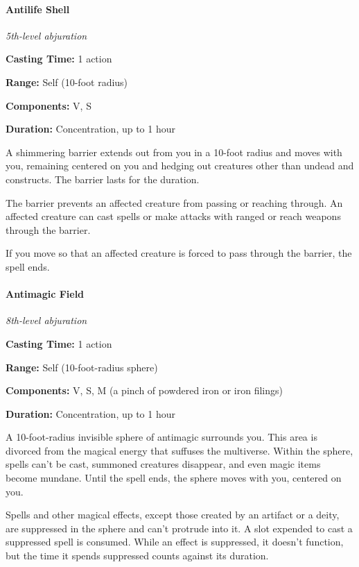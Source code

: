 \documentclass[
]{article}
\begin{document}
\hypertarget{antilife-shell}{%
\paragraph{Antilife Shell}\label{antilife-shell}}

\emph{5th-level abjuration}

\textbf{Casting Time:} 1 action

\textbf{Range:} Self (10-foot radius)

\textbf{Components:} V, S

\textbf{Duration:} Concentration, up to 1 hour

A shimmering barrier extends out from you in a 10-foot radius and moves
with you, remaining centered on you and hedging out creatures other than
undead and constructs. The barrier lasts for the duration.

The barrier prevents an affected creature from passing or reaching
through. An affected creature can cast spells or make attacks with
ranged or reach weapons through the barrier.

If you move so that an affected creature is forced to pass through the
barrier, the spell ends.

\hypertarget{antimagic-field}{%
\paragraph{Antimagic Field}\label{antimagic-field}}

\emph{8th-level abjuration}

\textbf{Casting Time:} 1 action

\textbf{Range:} Self (10-foot-radius sphere)

\textbf{Components:} V, S, M (a pinch of powdered iron or iron filings)

\textbf{Duration:} Concentration, up to 1 hour

A 10-foot-radius invisible sphere of antimagic surrounds you. This area
is divorced from the magical energy that suffuses the multiverse. Within
the sphere, spells can't be cast, summoned creatures disappear, and even
magic items become mundane. Until the spell ends, the sphere moves with
you, centered on you.

Spells and other magical effects, except those created by an artifact or
a deity, are suppressed in the sphere and can't protrude into it. A slot
expended to cast a suppressed spell is consumed. While an effect is
suppressed, it doesn't function, but the time it spends suppressed
counts against its duration.
\end{document}
